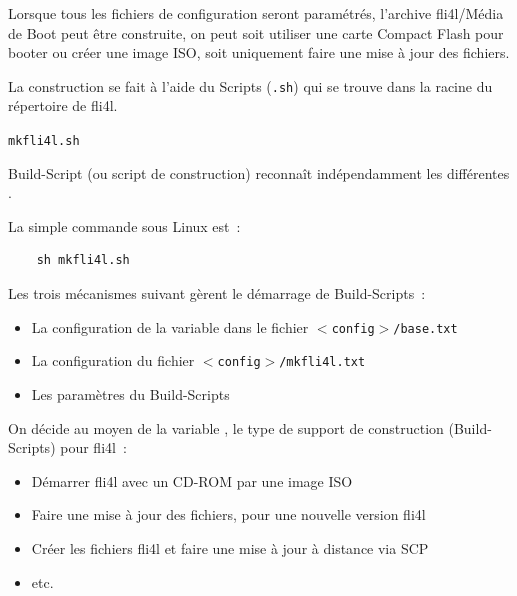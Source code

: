

  Lorsque tous les fichiers de configuration seront paramétrés,
  l'archive fli4l/Média de Boot peut être construite, on peut
  soit utiliser une carte Compact Flash pour booter ou créer une image ISO,
  soit uniquement faire une mise à jour des fichiers.



  La construction se fait à l'aide du Scripts (\texttt{.sh}) qui se trouve
  dans la racine du répertoire de fli4l.

  \begin{description}
    \item \texttt{mkfli4l.sh}
  \end{description}

  Build-Script (ou script de construction) reconnaît indépendamment
  les différentes .

  La simple commande sous Linux est~:
  \begin{verbatim}
    sh mkfli4l.sh
  \end{verbatim}

  Les trois mécanismes suivant gèrent le démarrage de Build-Scripts~:
  \begin{itemize}
    \item La configuration de la variable  dans le
          fichier \texttt{$<$config$>$/base.txt}
    \item La configuration du fichier \texttt{$<$config$>$/mkfli4l.txt}
    \item Les paramètres du Build-Scripts
  \end{itemize}

  On décide au moyen de la variable ,
  le type de support de construction (Build-Scripts) pour fli4l~:
  \begin{itemize}
    \item Démarrer fli4l avec un CD-ROM par une image ISO
    \item Faire une mise à jour des fichiers, pour une nouvelle
      version fli4l
    \item Créer les fichiers fli4l et faire une mise à jour à distance via SCP
    \item etc.
  \end{itemize}

